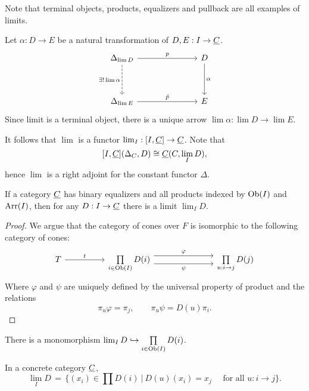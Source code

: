 Note that terminal objects, products, equalizers and pullback are all examples of limits.

\vspace*{3mm}

Let \( \alpha: D \to E \) be a natural transformation of \( D, E: I \to \underline{C} \).
\[
	\begin{tikzcd}{\Delta_{\lim D}} &&& D \\
		\\
		{\Delta_{\lim E}} &&& E
		\arrow["p", from=1-1, to=1-4]
		\arrow["{\exists! \lim\alpha}"', dashed, from=1-1, to=3-1]
		\arrow["\alpha", from=1-4, to=3-4]
		\arrow["{\tilde{p}}", from=3-1, to=3-4]
	\end{tikzcd}
\]
Since limit is a terminal object, there is a unique arrow \( \lim \alpha: \lim D \to \lim E \).

\vspace*{4mm}

It follows that \( \lim \) is a functor \( \lim_I: [I, \underline{C}] \to \underline{C} \). Note that
\[
	[I, \underline{C}](\Delta_C, D) \cong \underline{C}(C, \lim_I D),
\]
hence \( \lim \) is a right adjoint for the constant functor \( \Delta \).

\begin{theorem*}
	If a category \( \underline{C} \) has binary equalizers and all products indexed by \( \operatorname{Ob}(I) \) and \( \operatorname{Arr}(I) \), then for any \( D: I \to \underline{C} \) there is a limit \( \lim_I D \).
\end{theorem*}
\begin{proof}
	We argue that the category of cones over \( F \) is isomorphic to the following category of cones:
	\[
		\begin{tikzcd}
			T && {\prod\limits_{i \in \text{Ob}(I)} D(i)} &&& {\prod\limits_{u: i \to j} D(j)}
			\arrow["t", from=1-1, to=1-3]
			\arrow["\varphi", shift left=2, from=1-3, to=1-6]
			\arrow["\psi"', shift right=2, from=1-3, to=1-6]
		\end{tikzcd}
	\]
	Where \( \varphi \) and \( \psi \) are uniquely defined by the universal property of product and the relations
	\[
		\pi_u \varphi = \pi_j, \qquad \pi_u \psi = D(u) \pi_i.
	\]
\end{proof}

\begin{corollary*}
	There is a monomorphism \( \lim_I D \hookrightarrow \prod\limits_{i \in \operatorname{Ob}(I)} D(i) \).
\end{corollary*}

\begin{example*}
	In a concrete category \( \underline{C} \),
	\[
		\lim_I D \,=\, \bigl\{(x_i) \in \prod D(i) ~\big|~ D(u)(x_i)=x_j \quad \text{ for all } u: i \to j\bigr\}.
	\]
\end{example*}

